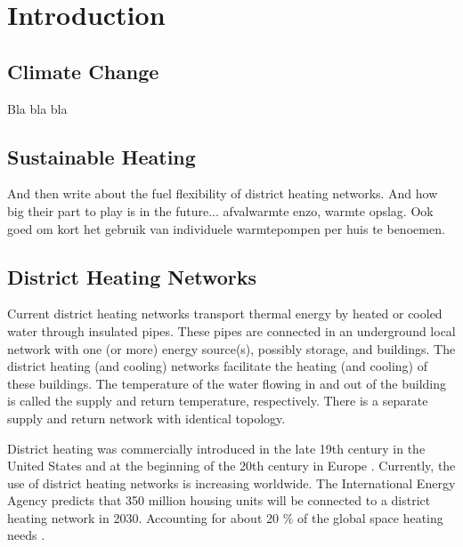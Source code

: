 %
\chapter{Introduction} \label{chap::intro}
\section{Climate Change}
Bla bla bla
\section{Sustainable Heating}
 And then write about the fuel flexibility of district heating networks. And how big their part to play is in the future... afvalwarmte enzo, warmte opslag. Ook goed om kort het gebruik van individuele warmtepompen per huis te benoemen. 


\section{District Heating Networks}
Current district heating networks transport thermal energy by heated or cooled water through insulated pipes. These pipes are connected in an underground local network with one (or more) energy source(s), possibly storage, and buildings. The district heating (and cooling) networks facilitate the heating (and cooling) of these buildings. The temperature of the water flowing in and out of the building is called the supply and return temperature, respectively. There is a separate supply and return network with identical topology. 

District heating was commercially introduced in the late 19th century in the United States and at the beginning of the 20th century in Europe \cite{bookMax}. Currently, the use of district heating networks is increasing worldwide. The International Energy Agency predicts that 350 million housing units will be connected to a district heating network in 2030. Accounting for about 20 $\%$ of the global space heating needs \cite{IEAheating}. \\

